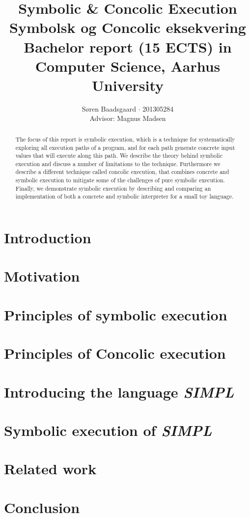 \documentclass[]{report}
\title{
	\textbf{Symbolic \& Concolic Execution}\\
	{ Symbolsk og Concolic eksekvering}\\
	\bigskip
	\large Bachelor report (15 ECTS) in Computer Science, Aarhus University\\
	}
\author{Søren Baadsgaard $\cdot$ 201305284 \\
	Advisor: Magnus Madsen}
\newcommand{\explanguage}{\textsl{SIMPL }}
\begin{document}
\maketitle

\begin{abstract}
	The focus of this report is symbolic execution, which is a technique for systematically exploring all execution paths of a program, and for each path generate concrete input values that will execute along this path. We describe the theory behind symbolic execution and discuss a number of limitations to the technique. Furthermore we describe a different technique called concolic execution, that combines concrete and symbolic execution to mitigate some of the challenges of pure symbolic execution. Finally, we demonstrate symbolic execution by describing and comparing an implementation of both a concrete and symbolic interpreter for a small toy language. 
\end{abstract}

\tableofcontents

\chapter{Introduction}
	
	
\chapter{Motivation}
	
\chapter{Principles of symbolic execution}
	
\chapter{Principles of Concolic execution}
	
\chapter{Introducing the language \explanguage}
	
\chapter{Symbolic execution of \explanguage}
	
\chapter{Related work}
	
\chapter{Conclusion}
	

\appendix



\end{document}
